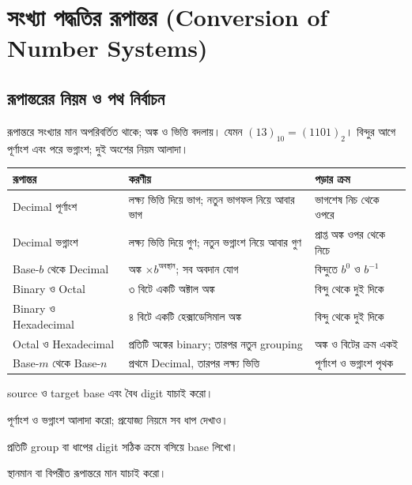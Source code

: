 \section{সংখ্যা পদ্ধতির রূপান্তর (\textenglish{Conversion of Number Systems})}

\subsection{রূপান্তরের নিয়ম ও পথ নির্বাচন}
রূপান্তরে সংখ্যার মান অপরিবর্তিত থাকে; অঙ্ক ও ভিত্তি বদলায়। যেমন $(13)_{10}=(1101)_2$। বিন্দুর আগে পূর্ণাংশ এবং পরে ভগ্নাংশ; দুই অংশের নিয়ম আলাদা।
\begin{center}\begin{tabularx}{\linewidth}{|L{.26\linewidth}|Y|L{.23\linewidth}|}\hline
রূপান্তর & করণীয় & পড়ার ক্রম\\\hline
Decimal পূর্ণাংশ & লক্ষ্য ভিত্তি দিয়ে ভাগ; নতুন ভাগফল নিয়ে আবার ভাগ & ভাগশেষ নিচ থেকে ওপরে\\\hline
Decimal ভগ্নাংশ & লক্ষ্য ভিত্তি দিয়ে গুণ; নতুন ভগ্নাংশ নিয়ে আবার গুণ & প্রাপ্ত অঙ্ক ওপর থেকে নিচে\\\hline
Base-$b$ থেকে Decimal & অঙ্ক $\times b^{\text{অবস্থান}}$; সব অবদান যোগ & বিন্দুতে $b^0$ ও $b^{-1}$\\\hline
Binary ও Octal & ৩ বিটে একটি অক্টাল অঙ্ক & বিন্দু থেকে দুই দিকে\\\hline
Binary ও Hexadecimal & ৪ বিটে একটি হেক্সাডেসিমাল অঙ্ক & বিন্দু থেকে দুই দিকে\\\hline
Octal ও Hexadecimal & প্রতিটি অঙ্কের binary; তারপর নতুন grouping & অঙ্ক ও বিটের ক্রম একই\\\hline
Base-$m$ থেকে Base-$n$ & প্রথমে Decimal, তারপর লক্ষ্য ভিত্তি & পূর্ণাংশ ও ভগ্নাংশ পৃথক\\\hline
\end{tabularx}\end{center}
\begin{compactenum}
\item source ও target base এবং বৈধ digit যাচাই করো।
\item পূর্ণাংশ ও ভগ্নাংশ আলাদা করো; প্রযোজ্য নিয়মে সব ধাপ দেখাও।
\item প্রতিটি group বা ধাপের digit সঠিক ক্রমে বসিয়ে base লিখো।
\item স্থানমান বা বিপরীত রূপান্তরে মান যাচাই করো।
\end{compactenum}
